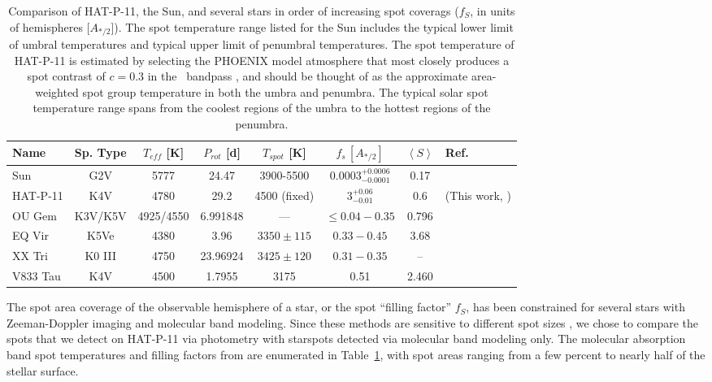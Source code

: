 \begin{table}
\centering
\begin{tabular}{|lccccccp{3cm}|} 
\hline
Name & Sp. Type & $T_{eff}$ [K] & $P_{rot}$ [d] & $T_{spot}$ [K] & $f_s \, [A_{*/2}]$ & $\left < S \right>$ & Ref. \\ \hline \hline
Sun & G2V & 5777 & 24.47 & 3900-5500 & $0.0003^{+0.0006}_{-0.0001}$ & 0.17 & \citet{Howard1984, Solanki2003, Egeland2017}\\
HAT-P-11 & K4V & 4780 & 29.2 & 4500 (fixed) & $3^{+0.06}_{-0.01}$ & 0.6 & (This work, \citet{bakos2010}) \\
OU Gem  & K3V/K5V & 4925/4550 & 6.991848 & --- & $\le 0.04 - 0.35$ & 0.796 & \citet{ONeal2001, Pace2013} \\
EQ Vir  & K5Ve & 4380 & 3.96 &  $3350 \pm 115$ &$0.33 - 0.45$ & 3.68 & \citet{ONeal2001, Cincunegui2007} \\
XX Tri & K0 III & 4750 & 23.96924 & $3425 \pm 120$ & $0.31 - 0.35$ & -- & \citet{ONeal2004} \\
V833 Tau & K4V & 4500 & 1.7955 & 3175  & 0.51 & 2.460 & \citet{ONeal2004, Pace2013} \\ \hline
\end{tabular}
\caption{Comparison of HAT-P-11, the Sun, and several stars in order of increasing spot coverags ($f_S$, in units of hemispheres [$A_{*/2}$]). The spot temperature range listed for the Sun includes the typical lower limit of umbral temperatures and typical upper limit of penumbral temperatures. The spot temperature of HAT-P-11 is estimated by selecting the PHOENIX model atmosphere that most closely produces a spot contrast of $c=0.3$ in the \kepler\ bandpass \citep{Husser2013}, and should be thought of as the approximate area-weighted spot group temperature in both the umbra and penumbra. The typical solar spot temperature range spans from the coolest regions of the umbra to the hottest regions of the penumbra.}
\label{tab:fillfactors}
\end{table}

The spot area coverage of the observable hemisphere of a star, or the spot ``filling factor'' $f_S$, has been constrained for several stars with Zeeman-Doppler imaging and molecular band modeling. Since these methods are sensitive to different spot sizes \citep{Solanki2004}, we chose to compare the spots that we detect on HAT-P-11 via photometry with starspots detected via molecular band modeling only. The molecular absorption band spot temperatures and filling factors from \citet{ONeal2001, ONeal2004} are enumerated in Table~\ref{tab:fillfactors}, with spot areas ranging from a few percent to nearly half of the stellar surface. 

